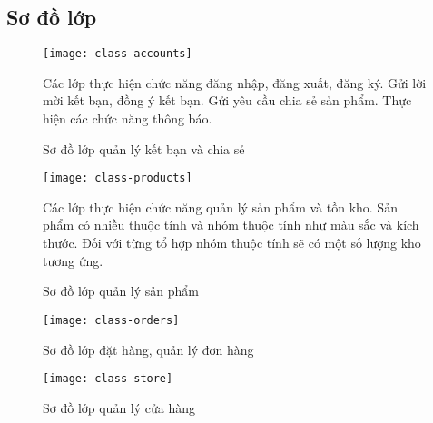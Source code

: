 \fontsize{13px}{13px}\selectfont\justifying

\clearpage
\subsection{Sơ đồ lớp}
\FloatBarrier
\begin{figure}[!htbp]\fontsize{13px}{13px}\selectfont
	\centering
	\texttt{[image: class-accounts]}
	\caption{Sơ đồ lớp quản lý kết bạn và chia sẻ}
	\justifying
	Các lớp thực hiện chức năng đăng nhập, đăng xuất, đăng ký. Gửi lời mời kết bạn, đồng ý kết bạn. Gửi yêu cầu chia sẻ sản phẩm. Thực hiện các chức năng thông báo.
\end{figure}

\FloatBarrier
\begin{figure}[!htbp]\fontsize{13px}{13px}\selectfont
	\centering
	\texttt{[image: class-products]}
	\caption{Sơ đồ lớp quản lý sản phẩm}
	\justifying
	Các lớp thực hiện chức năng quản lý sản phẩm và tồn kho. Sản phẩm có nhiều thuộc tính và nhóm thuộc tính như màu sắc và kích thước. Đối với từng tổ hợp nhóm thuộc tính sẽ có một số lượng kho tương ứng.
\end{figure}

\clearpage
\FloatBarrier
\begin{figure}[!htbp]\fontsize{13px}{13px}\selectfont
	\centering
	\texttt{[image: class-orders]}
	\caption{Sơ đồ lớp đặt hàng, quản lý đơn hàng}
\end{figure}
\FloatBarrier
\begin{figure}[!htbp]\fontsize{13px}{13px}\selectfont
	\centering
	\texttt{[image: class-store]}
	\caption{Sơ đồ lớp quản lý cửa hàng}
\end{figure}